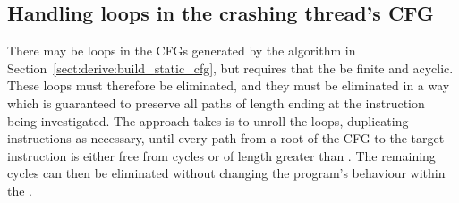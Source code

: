 \subsection{Handling loops in the crashing thread's CFG}
\label{sect:derive:handling_loops}

There may be loops in the CFGs generated by the algorithm in
Section~\ref{sect:derive:build_static_cfg}, but {\technique} requires
that the {\StateMachines} be finite and acyclic.  These loops must
therefore be eliminated, and they must be eliminated in a way which is
guaranteed to preserve all paths of length \backref{$\alpha$} ending
at the instruction being investigated.  The approach {\technique}
takes is to unroll the loops, duplicating instructions as necessary,
until every path from a root of the CFG to the target instruction is
either free from cycles or of length greater than \backref{$\alpha$}.
The remaining cycles can then be eliminated without changing the
program's behaviour within the .

